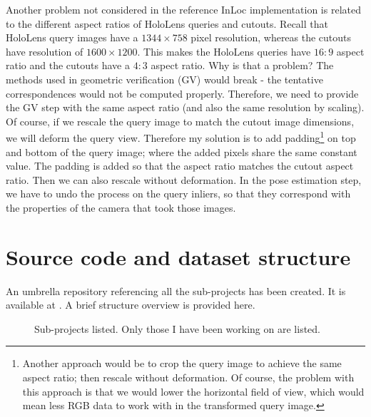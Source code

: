 \documentclass[twoside]{ctuthesis}
\theoremstyle{plain}
\theoremstyle{definition}
\theoremstyle{note}
\begin{document}
Another problem not considered in the reference InLoc implementation is related to the different aspect ratios of HoloLens queries and cutouts. Recall that HoloLens query images have a $1344 \times 758$ pixel resolution, whereas the cutouts have resolution of $1600 \times 1200$. This makes the HoloLens queries have $16:9$ aspect ratio and the cutouts have a $4:3$ aspect ratio. Why is that a problem? The methods used in geometric verification (GV) would break - the tentative correspondences would not be computed properly. Therefore, we need to provide the GV step with the same aspect ratio (and also the same resolution by scaling). Of course, if we rescale the query image to match the cutout image dimensions, we will deform the query view. Therefore my solution is to add padding\footnote{Another approach would be to crop the query image to achieve the same aspect ratio; then rescale without deformation. Of course, the problem with this approach is that we would lower the horizontal field of view, which would mean less RGB data to work with in the transformed query image.} on top and bottom of the query image; where the added pixels share the same constant value. The padding is added so that the aspect ratio matches the cutout aspect ratio. Then we can also rescale without deformation. In the pose estimation step, we have to undo the process on the query inliers, so that they correspond with the properties of the camera that took those images.

\section{Source code and dataset structure}

An umbrella repository referencing all the sub-projects has been created. It is available at \cite{UmbrellaRepo}. A brief structure overview is provided here.

\begin{figure}[htb!]
	\centering
	\label{fig:all-subprojects-listed}
	\caption[Organization of sub-projects]{Sub-projects listed. Only those I have been working on are listed.}
\end{figure}
\end{document}
